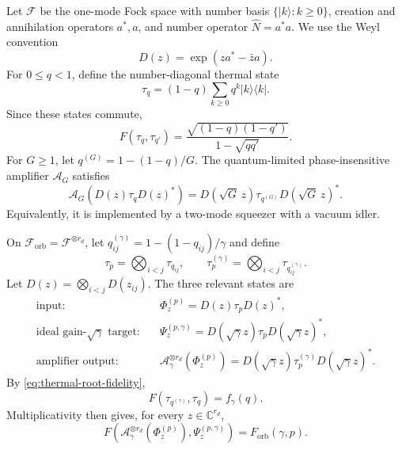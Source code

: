 \documentclass[11pt]{article}
\theoremstyle{remark}
\theoremstyle{plain}
\newcommand{\C}{\mathbb C}
\newcommand{\cA}{\mathcal A}
\newcommand{\cF}{\mathcal F}
\newcommand{\ket}[1]{|#1\rangle}
\newcommand{\proj}[1]{|#1\rangle\!\langle #1|}
\newcommand{\ot}{\otimes}
\newcommand{\Forb}{F_{\mathrm{orb}}}
\begin{document}
Let \(\cF\) be the one-mode Fock space with number basis
\(\{\ket{k}:k\ge0\}\), creation and annihilation operators \(a^*,a\), and
number operator \(\widehat N=a^*a\).  We use the Weyl convention
\begin{equation}\label{eq:Weyl-convention}
  D(z)=\exp(z a^*-\bar z a).
\end{equation}
For \(0\le q<1\), define the number-diagonal thermal state
\[
  \tau_q=(1-q)\sum_{k\ge0}q^k\proj{k}.
\]
Since these states commute,
\begin{equation}\label{eq:thermal-root-fidelity}
  F(\tau_q,\tau_{q'})
  =\frac{\sqrt{(1-q)(1-q')}}{1-\sqrt{qq'}}.
\end{equation}
For \(G\ge1\), let \(q^{(G)}=1-(1-q)/G\).  The quantum-limited
phase-insensitive amplifier \(\cA_G\) satisfies
\begin{equation}\label{eq:amplifier-action}
  \cA_G\!\left(D(z)\tau_qD(z)^*\right)
  =D(\sqrt G\,z)\tau_{q^{(G)}}D(\sqrt G\,z)^*.
\end{equation}
Equivalently, it is implemented by a two-mode squeezer with a vacuum idler.

On \(\cF_{\mathrm{orb}}=\cF^{\ot r_d}\), let
\(q_{ij}^{(\gamma)}=1-(1-q_{ij})/\gamma\) and define
\begin{equation}\label{eq:sector-thermal-products}
  \tau_p=\bigotimes_{i<j}\tau_{q_{ij}},
  \qquad
  \tau_p^{(\gamma)}=\bigotimes_{i<j}\tau_{q_{ij}^{(\gamma)}}.
\end{equation}
Let \(D(z)=\bigotimes_{i<j}D(z_{ij})\).  The three relevant states are
\begin{equation}\label{eq:gaussian-amplification-model}
\begin{aligned}
  \text{input:}\quad
  &\Phi_z^{(p)}=D(z)\tau_pD(z)^*,\\
  \text{ideal gain-\(\sqrt\gamma\) target:}\quad
  &\Psi_z^{(p,\gamma)}=D(\sqrt\gamma z)\tau_pD(\sqrt\gamma z)^*,\\
  \text{amplifier output:}\quad
  &\cA_\gamma^{\ot r_d}(\Phi_z^{(p)})
    =D(\sqrt\gamma z)\tau_p^{(\gamma)}D(\sqrt\gamma z)^*.
\end{aligned}
\end{equation}
By \eqref{eq:thermal-root-fidelity},
\begin{equation}\label{eq:one-mode-f}
  F(\tau_{q^{(\gamma)}},\tau_q)=f_\gamma(q).
\end{equation}
Multiplicativity then gives, for every \(z\in\C^{r_d}\),
\begin{equation}\label{eq:product-amplifier-fidelity}
  F\!\left(\cA_\gamma^{\ot r_d}(\Phi_z^{(p)}),
           \Psi_z^{(p,\gamma)}\right)
  =\Forb(\gamma,p).
\end{equation}
\end{document}
